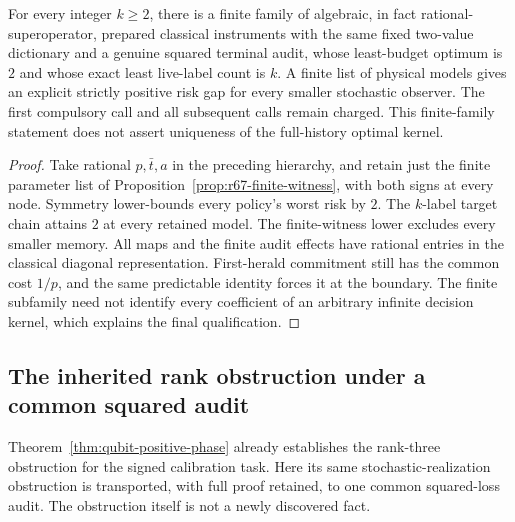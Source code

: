 \begin{corollary}\label{cor:r67-finite-hierarchy}
For every integer $k\ge2$, there is a finite family of algebraic, in fact rational-superoperator, prepared classical instruments with the same fixed two-value dictionary and a genuine squared terminal audit, whose least-budget optimum is $2$ and whose exact least live-label count is $k$. A finite list of physical models gives an explicit strictly positive risk gap for every smaller stochastic observer. The first compulsory call and all subsequent calls remain charged. This finite-family statement does not assert uniqueness of the full-history optimal kernel.
\end{corollary}
\begin{proof}
Take rational $p,\bar t,a$ in the preceding hierarchy, and retain just the finite parameter list of Proposition~\ref{prop:r67-finite-witness}, with both signs at every node. Symmetry lower-bounds every policy's worst risk by $2$. The $k$-label target chain attains $2$ at every retained model. The finite-witness lower excludes every smaller memory. All maps and the finite audit effects have rational entries in the classical diagonal representation. First-herald commitment still has the common cost $1/p$, and the same predictable identity forces it at the boundary. The finite subfamily need not identify every coefficient of an arbitrary infinite decision kernel, which explains the final qualification.
\end{proof}

\subsection{The inherited rank obstruction under a common squared audit}
Theorem~\ref{thm:qubit-positive-phase} already establishes the rank-three obstruction for the signed calibration task. Here its same stochastic-realization obstruction is transported, with full proof retained, to one common squared-loss audit. The obstruction itself is not a newly discovered fact.

